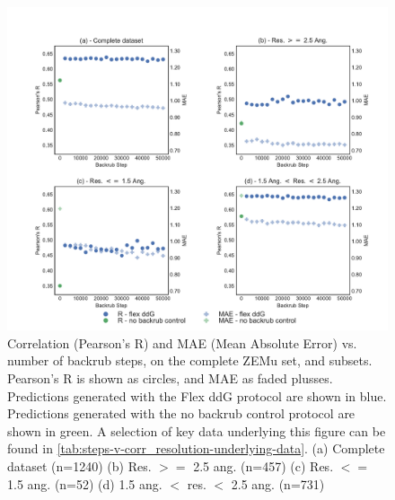 \begin{figure}
  \includegraphics[width=\textwidth,keepaspectratio]{steps-v-corr_resolution.pdf}
  \caption[Flex ddG performance vs. number of backrub steps]{
    Correlation (Pearson's R) and MAE (Mean Absolute Error) vs. number of backrub steps, on the complete ZEMu set, and subsets.
    Pearson's R is shown as circles, and MAE as faded plusses.
Predictions generated with the Flex ddG protocol are shown in blue.
Predictions generated with the no backrub control protocol are shown in green.
    A selection of key data underlying this figure can be found in \cref{tab:steps-v-corr_resolution-underlying-data}.
    (a) Complete dataset (n=1240)
    (b) Res. $>=$ 2.5 ang. (n=457)
    (c) Res. $<=$ 1.5 ang. (n=52)
    (d) 1.5 ang. $<$ res. $<$ 2.5 ang. (n=731)
  } \label{fig:steps-v-corr_resolution}
\end{figure}
